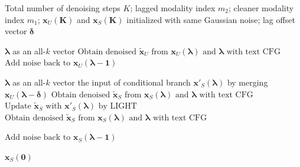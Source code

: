 \begin{algorithm}[!t]
\caption{Inference with pace-induced guidance}
\label{alg:diffusion_inference}
\begin{algorithmic}[1]
\Require Total number of denoising steps $K$; lagged modality index $m_2$; cleaner modality index $m_1$; $\boldsymbol{x}_U(\boldsymbol K)$ and $\boldsymbol{x}_S(\boldsymbol K)$ initialized with same Gaussian noise; lag offset vector $\boldsymbol{\delta}$

  \State {} $\boldsymbol\lambda$ as an all-$k$ vector
  \State $ \text{Obtain denoised } \tilde{\boldsymbol{x}}_U \text{ from } \boldsymbol{x}_U(\boldsymbol\lambda) \text{ and } \boldsymbol\lambda \text{ with text CFG} $  
  \State $ \text{Add noise back to } \boldsymbol{x}_U(\boldsymbol\lambda-\boldsymbol 1)$    
\EndFor

  \State {} $\boldsymbol\lambda$ as an all-$k$ vector
    \State {} the input of conditional branch $\boldsymbol{x}'_S(\boldsymbol\lambda)$ by merging $\boldsymbol{x}_U(\boldsymbol\lambda - \boldsymbol \delta)$ 
    \State $ \text{Obtain denoised } \tilde{\boldsymbol{x}}_S \text{ from } \boldsymbol{x}_S(\boldsymbol\lambda) \text{ and } \boldsymbol\lambda\text{ with text CFG} $  
    \State $ \text{Update } \tilde{\boldsymbol{x}}_S \text{ with }\boldsymbol{x}'_S(\boldsymbol\lambda) \text{ by LIGHT} $ 
  \Else
    \State $ \text{Obtain denoised } \tilde{\boldsymbol{x}}_S \text{ from } \boldsymbol{x}_S(\boldsymbol\lambda) \text{ and } \boldsymbol\lambda\text{ with text CFG} $
  \EndIf

   \State $ \text{Add noise back to } \boldsymbol{x}_S(\boldsymbol\lambda-\boldsymbol 1)$   
\EndFor

\State \Return $\boldsymbol{x}_S(\boldsymbol 0)$
\end{algorithmic}
\end{algorithm}
